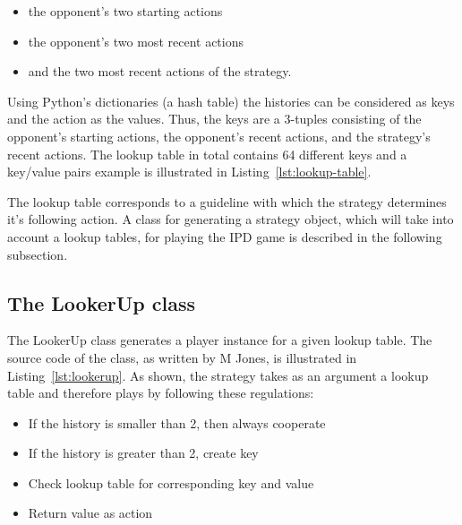 \begin{itemize}
  \item the opponent's two starting actions
  \item the opponent's two most recent actions
  \item and the two most recent actions of the strategy.
\end{itemize}

Using Python's dictionaries (a hash table) the histories can be considered as keys and
the action as the values. Thus, the keys are a 3-tuples consisting of the opponent's
starting actions, the opponent's recent actions, and the strategy's recent actions.
The lookup table in total contains 64 different keys and a key/value pairs example
is illustrated in Listing~\ref{lst:lookup-table}.


The lookup table corresponds to a guideline with which the strategy determines it's following action.
A class for generating a strategy object, which  will take into account a lookup tables,
for playing the IPD game is described in the following subsection.

\subsection{The LookerUp class}

The LookerUp class generates a player instance for a given lookup table.
The source code of the class, as written by M Jones, is illustrated in
Listing~\ref{lst:lookerup}. As shown, the strategy takes as an argument
a lookup table and therefore plays by following these regulations:
\begin{itemize}
  \item If the history is smaller than 2, then  always cooperate
  \item If the history is greater than 2, create key
  \item Check lookup table for corresponding key and value
  \item Return value as action
\end{itemize}

